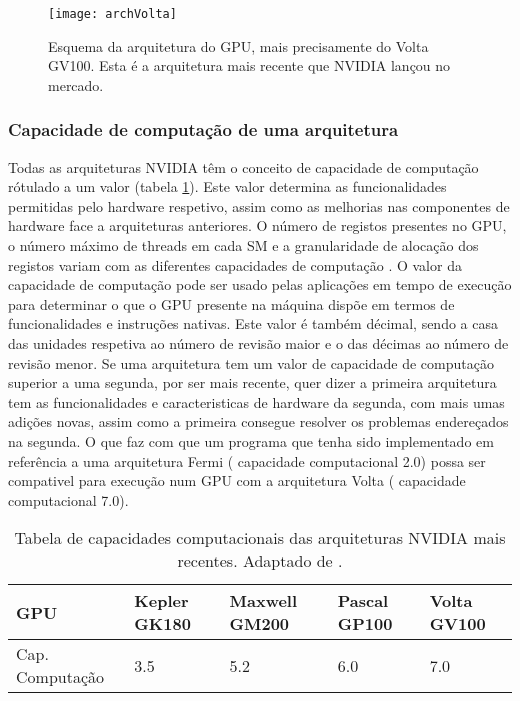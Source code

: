   \begin{figure}[ht]
  \centering
    {\texttt{[image: archVolta]}}
  \caption{Esquema da arquitetura do GPU, mais precisamente do Volta GV100\cite{voltaArch}. Esta é a arquitetura mais recente que NVIDIA lançou no mercado.}
  \label{voltaArch}
\end{figure}
\subsubsection{Capacidade de computação de uma arquitetura}
Todas as arquiteturas NVIDIA têm o conceito de capacidade de computação rótulado a um valor (tabela \ref{tabelaCap}). Este valor determina as funcionalidades permitidas pelo hardware respetivo, assim como as melhorias nas componentes de hardware face a arquiteturas anteriores. O número de registos presentes no GPU, o número máximo de threads em cada SM e a granularidade de alocação dos registos variam com as diferentes capacidades de computação \cite{cudaProgGuide}. O valor da capacidade de computação pode ser usado pelas aplicações em tempo de execução para determinar o que o GPU presente na máquina dispõe em termos de funcionalidades e instruções nativas. Este valor é também décimal, sendo a casa das unidades respetiva ao número de revisão maior e o das décimas ao número de revisão menor. Se uma arquitetura tem um valor de capacidade de computação superior a uma segunda, por ser mais recente, quer dizer a primeira arquitetura tem as funcionalidades e caracteristicas de hardware da segunda, com mais umas adições novas, assim como a primeira consegue resolver os problemas endereçados na segunda. O que faz com que um programa que tenha sido implementado em referência a uma arquitetura Fermi ( capacidade computacional 2.0) possa ser compativel para execução num GPU com a arquitetura Volta ( capacidade computacional 7.0).
\begin{table}[]
\centering

\begin{tabular}{|l|l|l|l|l|}
\hline
GPU             & Kepler GK180 & Maxwell GM200 & Pascal GP100 & Volta GV100 \\ \hline
Cap. Computação & 3.5          & 5.2           & 6.0          & 7.0         \\ \hline
\end{tabular}
\caption{Tabela de capacidades computacionais das arquiteturas NVIDIA mais recentes. Adaptado de \cite{voltaArch}.}
\label{tabelaCap}
\end{table}
%
%
